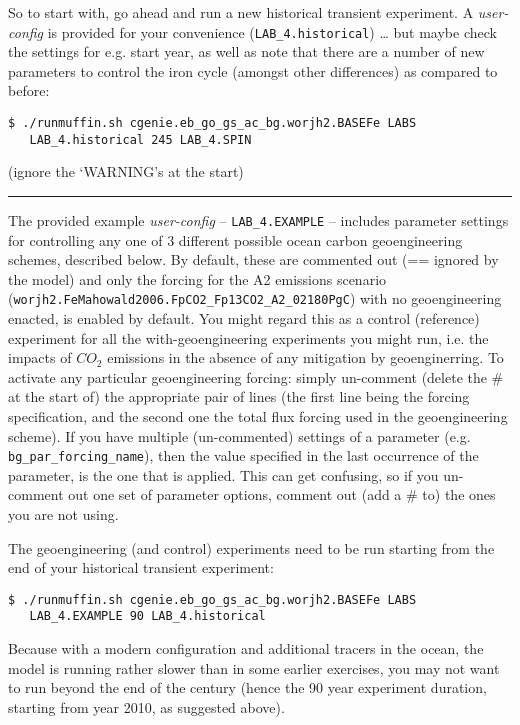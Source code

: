 \documentclass[11pt,fleqn]{book} %
\begin{document}
\noindent So to start with, go ahead and run a new historical transient experiment. A \textit{user-config} is provided for your convenience (\texttt{LAB\_4.historical}) … but maybe check the settings for e.g. start year, as well as note that there are a number of new parameters to control the iron cycle (amongst other differences) as compared to before: 
\vspace{-2pt}\begin{verbatim}
$ ./runmuffin.sh cgenie.eb_go_gs_ac_bg.worjh2.BASEFe LABS
   LAB_4.historical 245 LAB_4.SPIN
\end{verbatim}\vspace{-2pt}
(ignore the ‘WARNING’s at the start)

\vspace{1mm}
\noindent\rule{4cm}{0.1mm}
\vspace{2mm}

\noindent The provided example \textit{user-config} -- \texttt{LAB\_4.EXAMPLE} -- includes parameter settings for controlling any one of 3 different possible ocean carbon geoengineering schemes, described below. By default, these are commented out (== ignored by the model) and only the forcing for the A2 emissions scenario (\texttt{worjh2.FeMahowald2006.FpCO2\_Fp13CO2\_A2\_02180PgC}) with no geoengineering enacted,  is enabled by default. You might regard this as a control (reference) experiment for all the with-geoengineering experiments you might run, i.e. the impacts of \(CO_{2}\) emissions in the absence of any mitigation by geoenginerring. To activate any particular geoengineering forcing: simply un-comment (delete the \# at the start of) the appropriate pair of lines (the first line being the forcing specification, and the second one the total flux forcing used in the geoengineering scheme). If you have multiple (un-commented) settings of a parameter (e.g. \texttt{bg\_par\_forcing\_name}), then the value specified in the last occurrence of the parameter, is the one that is applied. This can get confusing, so if you un-comment out one set of parameter options, comment out (add a \# to) the ones you are not using.

The geoengineering (and control) experiments need to be run starting from the end of your historical transient experiment:
\vspace{-2pt}\begin{verbatim}
$ ./runmuffin.sh cgenie.eb_go_gs_ac_bg.worjh2.BASEFe LABS
   LAB_4.EXAMPLE 90 LAB_4.historical
\end{verbatim}\vspace{-2pt}
Because with a modern configuration and additional tracers in the ocean, the model is running rather slower than in some earlier exercises, you may not want to run beyond the end of the century (hence the 90 year experiment duration, starting from year 2010, as suggested above).
\end{document}
